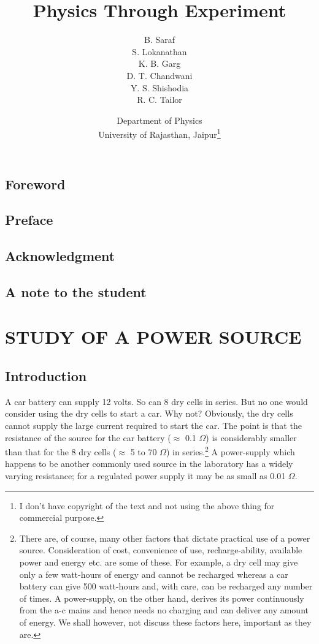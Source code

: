 \documentclass[12pt]{book}
\title{Physics Through Experiment}
\author{B. Saraf\\S. Lokanathan\\K. B. Garg\\D. T. Chandwani\\Y. S. Shishodia\\R. C. Tailor}
\date{Department of Physics\\University of Rajasthan, Jaipur\thanks{I don't have copyright of the text and not using the above thing for commercial purpose.}}
\begin{document}
\maketitle

\chapter*{}
\section{Foreword}
\section{Preface}
\section{Acknowledgment}
\section{A note to the student}

\tableofcontents

\chapter{STUDY OF A POWER SOURCE}
\section{Introduction}
A car battery can supply 12 volts. So can 8 dry cells in series. But no one would consider using the dry cells to start a car. Why not? Obviously, the dry cells cannot supply the large current required to start the car. The point is that the resistance of the source for the car battery ($\approx$ 0.1 $\Omega$) is considerably smaller than that for the 8 dry cells ($\approx$ 5 to 70 $\Omega$) in series.\footnote{There are, of course, many other factors that dictate practical use of a power source. Consideration of cost, convenience of use, recharge-ability, available power and energy etc. are some of these. For example, a dry cell may give only a few watt-hours of energy and cannot be recharged whereas a car battery can give 500 watt-hours and, with care, can be recharged any number of times. A power-supply, on the other hand, derives its power continuously from the a-c mains and hence needs no charging and can deliver any amount of energy. We shall however, not discuss these factors here, important as they are.} A power-supply which happens to be another commonly used source in the laboratory has a widely varying resistance; for a regulated power supply it may be as small as 0.01 $\Omega$.
\end{document}
